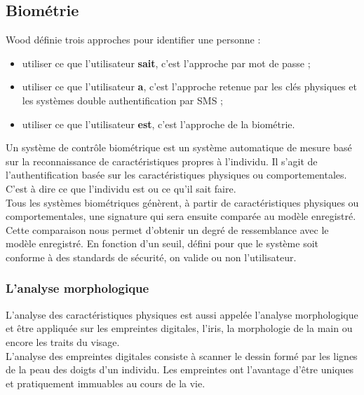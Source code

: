 \subsection{Biométrie}

Wood\cite{wood1977} définie trois approches pour identifier une personne :\\

\begin{itemize}
	\item utiliser ce que l'utilisateur \textbf{sait}, c'est l'approche par mot de passe ;
	\item utiliser ce que l'utilisateur \textbf{a}, c'est l'approche retenue par les clés physiques et les systèmes double authentification par SMS ;
	\item utiliser ce que l'utilisateur \textbf{est}, c'est l'approche de la biométrie.\\
\end{itemize}

Un système de contrôle biométrique est un système automatique de mesure basé sur la reconnaissance de caractéristiques propres à l'individu. Il s'agit de l'authentification basée sur les caractéristiques physiques ou comportementales. C'est à dire ce que l'individu est ou ce qu'il sait faire.\\

Tous les systèmes biométriques génèrent, à partir de caractéristiques physiques ou comportementales, une signature qui sera ensuite comparée au modèle enregistré. Cette comparaison nous permet d'obtenir un degré de ressemblance avec le modèle enregistré. En fonction d'un seuil, défini pour que le système soit conforme à des standards de sécurité, on valide ou non l'utilisateur.

\subsubsection{L'analyse morphologique}

L'analyse des caractéristiques physiques est aussi appelée l'analyse morphologique et être appliquée sur les empreintes digitales, l'iris, la morphologie de la main ou encore les traits du visage.\\

L'analyse des empreintes digitales consiste à scanner le dessin formé par les lignes de la peau des doigts d'un individu. Les empreintes ont l'avantage d'être uniques et pratiquement immuables au cours de la vie.\\

